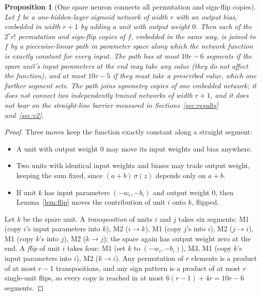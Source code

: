 \documentclass[11pt]{article}
\newtheorem{proposition}{Proposition}
\begin{document}
\begin{proposition}[One spare neuron connects all permutation and sign-flip copies]
\label{prop:spare}
Let $f$ be a one-hidden-layer sigmoid network of width $r$ with an output bias, embedded in width $r+1$ by adding a unit with output weight $0$. Then each of the $2^r r!$ permutation and sign-flip copies of $f$, embedded in the same way, is joined to $f$ by a piecewise-linear path in parameter space along which the network function is exactly constant for every input. The path has at most $10r - 6$ segments if the spare unit's input parameters at the end may take any value (they do not affect the function), and at most $10r - 5$ if they must take a prescribed value, which one further segment sets. The path joins symmetry copies of one embedded network; it does not connect two independently trained networks of width $r+1$, and it does not bear on the straight-line barrier measured in Sections~\ref{sec:results} and~\ref{sec:v2}.
\end{proposition}
\begin{proof}
Three moves keep the function exactly constant along a straight segment:
\begin{itemize}[leftmargin=*]
\item[(M1)] A unit with output weight $0$ may move its input weights and bias anywhere.
\item[(M2)] Two units with identical input weights and biases may trade output weight, keeping the sum fixed, since $(a+b)\,\sigma(z)$ depends only on $a+b$.
\item[(M3)] If unit $k$ has input parameters $(-w_i, -b_i)$ and output weight $0$, then Lemma~\ref{lem:flip} moves the contribution of unit $i$ onto $k$, flipped.
\end{itemize}
Let $k$ be the spare unit. A \emph{transposition} of units $i$ and $j$ takes six segments: M1 (copy $i$'s input parameters into $k$), M2 ($i \to k$), M1 (copy $j$'s into $i$), M2 ($j \to i$), M1 (copy $k$'s into $j$), M2 ($k \to j$); the spare again has output weight zero at the end. A \emph{flip} of unit $i$ takes four: M1 (set $k$ to $(-w_i, -b_i)$), M3, M1 (copy $k$'s input parameters into $i$), M2 ($k \to i$). Any permutation of $r$ elements is a product of at most $r-1$ transpositions, and any sign pattern is a product of at most $r$ single-unit flips, so every copy is reached in at most $6(r-1) + 4r = 10r - 6$ segments.
\end{proof}
\end{document}
